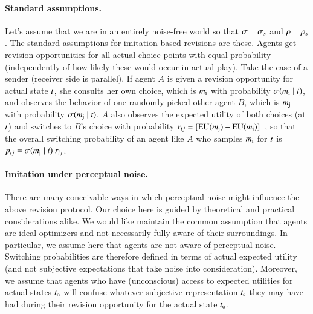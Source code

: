 \documentclass[fleqn,reqno,10pt]{article}
\begin{document}
\paragraph{Standard assumptions.} Let's assume that we are in an
entirely noise-free world so that $\sigma = \sigma_s$ and $\rho =
\rho_s$. The standard assumptions for imitation-based revisions are
these. Agents get revision opportunities for all actual choice points
with equal probability (independently of how likely these would occur
in actual play). Take the case of a sender (receiver side is
parallel). If agent $A$ is given a revision opportunity for actual
state $t$, she consults her own choice, which is $m_{\mathrm{i}}$
with probability $\sigma(m_{\mathrm{i}} \mid t)$, and observes
the behavior of one randomly picked other agent $B$, which is
$m_{\mathrm{j}}$ with probability $\sigma(m_{\mathrm{j}} \mid
t)$. $A$ also observes the expected utility of both choices (at
$t$) and switches to $B$'s choice with probability $r_{ij} = [
\mathrm{EU}(m_{\mathrm{j}}) - \mathrm{EU}(m_{\mathrm{i}}) ]_+$, so that the overall
switching probability of an agent like $A$ who samples $m_{\mathrm{i}}$
for $t$ is $p_{ij} = \sigma(m_{\mathrm{j}} \mid t) \
r_{ij}$.

\paragraph{Imitation under perceptual noise.} There are many
conceivable ways in which perceptual noise might influence the above
revision protocol. Our choice here is guided by theoretical and
practical considerations alike. We would like maintain the common
assumption that agents are ideal optimizers and not necessarily fully
aware of their surroundings. In particular, we assume here that agents
are not aware of perceptual noise. Switching probabilities are
therefore defined in terms of actual expected utility (and not
subjective expectations that take noise into consideration). Moreover,
we assume that agents who have (unconscious) access to expected
utilities for actual states $t_{\mathrm{o}}$ will confuse whatever
subjective representation $t_{\mathrm{s}}$ they may have had during their
revision opportunity for the actual state $t_{\mathrm{o}}$.
\end{document}
